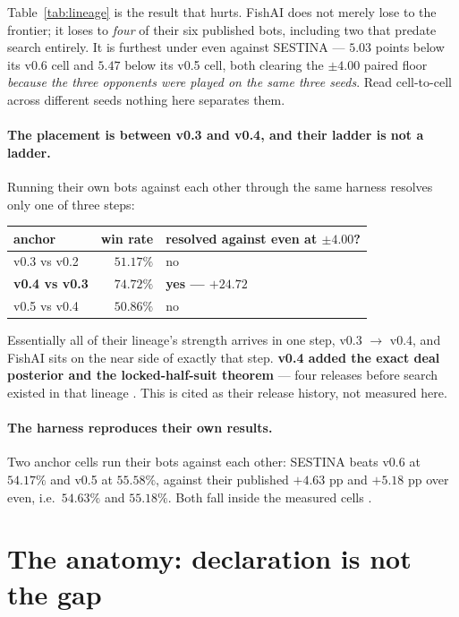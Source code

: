 \documentclass[11pt]{article}
\begin{document}
Table~\ref{tab:lineage} is the result that hurts. FishAI does not merely lose to the frontier; it
loses to \emph{four} of their six published bots, including two that predate search entirely. It is
furthest under even against SESTINA --- $5.03$ points below its v0.6 cell and $5.47$ below its v0.5
cell, both clearing the $\pm 4.00$ paired floor \emph{because the three opponents were played on the
same three seeds}. Read cell-to-cell across different seeds nothing here separates them.

\paragraph{The placement is between v0.3 and v0.4, and their ladder is not a ladder.} Running their
own bots against each other through the same harness resolves only one of three steps:

\begin{center}
\footnotesize
\begin{tabular}{@{}lrl@{}}
\toprule
anchor & win rate & resolved against even at $\pm 4.00$? \\
\midrule
v0.3 vs v0.2 & $51.17\%$ & no \\
\textbf{v0.4 vs v0.3} & $\mathbf{74.72\%}$ & \textbf{yes --- $+24.72$} \\
v0.5 vs v0.4 & $50.86\%$ & no \\
\bottomrule
\end{tabular}
\end{center}

Essentially all of their lineage's strength arrives in one step, v0.3 $\to$ v0.4, and FishAI sits on
the near side of exactly that step. \textbf{v0.4 added the exact deal posterior and the
locked-half-suit theorem} --- four releases before search existed in that lineage \cite{fishlab}.
This is cited as their release history, not measured here.

\paragraph{The harness reproduces their own results.} Two anchor cells run their bots against each
other: SESTINA beats v0.6 at $54.17\%$ and v0.5 at $55.58\%$, against their published $+4.63$ pp and
$+5.18$ pp over even, i.e.\ $54.63\%$ and $55.18\%$. Both fall inside the measured cells
\cite{crossplay, fishlab}.

\section{The anatomy: declaration is not the gap}
\label{sec:anatomy}
\end{document}

